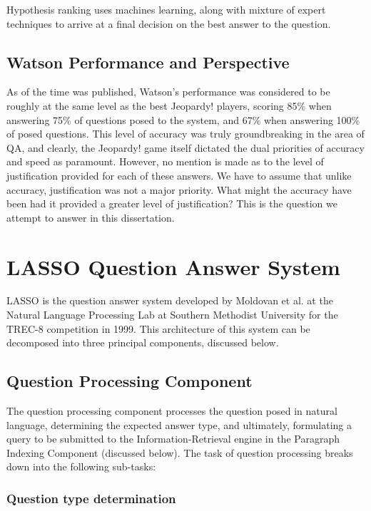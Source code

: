Hypothesis ranking uses machines learning, along with mixture of expert techniques to arrive at a final
decision on the best answer to the question.

\subsection{Watson Performance and Perspective}

As of the time \cite{ferrucci2010building} was published, Watson's performance was considered to be roughly at the same level as the best Jeopardy! players, scoring 85\% when answering 75\% of questions posed to the system, and 67\% when answering 100\% of posed questions.  This level of accuracy was truly groundbreaking in the area of QA, and clearly, the Jeopardy! game itself dictated the dual priorities of accuracy and speed as paramount.  However, no mention is made as to the level of justification provided for each of these answers.  We have to assume that unlike accuracy, justification was not a major priority.  What might the accuracy have been had it provided a greater level of justification?  This is the question we attempt to answer in this dissertation.

\section{LASSO Question Answer System}

LASSO \cite{moldovan_1999} is the question answer system developed by Moldovan et al. at the Natural Language Processing Lab at Southern Methodist University for the TREC-8 competition in 1999.  This architecture of this system can be decomposed into three principal components, discussed below.  

\subsection{Question Processing Component}

The question processing component processes the question posed in natural language, determining the expected answer type, and ultimately, formulating a query to be submitted to the Information-Retrieval engine in the Paragraph Indexing Component (discussed below).  The task of question processing breaks down into the following sub-tasks:

\subsubsection{Question type determination}

